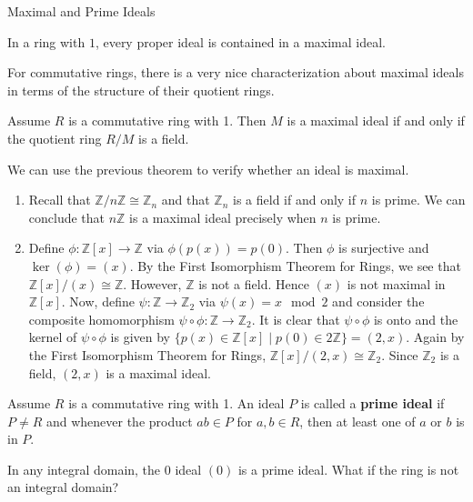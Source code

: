 \begin{section}{Maximal and Prime Ideals}
\begin{theorem}
In a ring with $1$, every proper ideal is contained in a maximal ideal.
\end{theorem}

For commutative rings, there is a very nice characterization about maximal ideals in terms of the structure of their quotient rings.

\begin{theorem}
Assume $R$ is a commutative ring with 1.  Then $M$ is a maximal ideal if and only if the quotient ring $R/M$ is a field.
\end{theorem}

\begin{example}
We can use the previous theorem to verify whether an ideal is maximal.
\begin{enumerate}[label=\textrm{(\alph*)}]
\item Recall that $\mathbb{Z}/n\mathbb{Z}\cong \mathbb{Z}_n$ and that $\mathbb{Z}_n$ is a field if and only if $n$ is prime.  We can conclude that $n\mathbb{Z}$ is a maximal ideal precisely when $n$ is prime.
\item Define $\phi:\mathbb{Z}[x]\to\mathbb{Z}$ via $\phi(p(x))=p(0)$.  Then $\phi$ is surjective and $\ker(\phi)=(x)$.  By the First Isomorphism Theorem for Rings, we see that $\mathbb{Z}[x]/(x)\cong \mathbb{Z}$.  However, $\mathbb{Z}$ is not a field.  Hence $(x)$ is not maximal in $\mathbb{Z}[x]$.  Now, define $\psi:\mathbb{Z}\to\mathbb{Z}_2$ via $\psi(x)=x\mod 2$ and consider the composite homomorphism $\psi\circ\phi:\mathbb{Z}\to\mathbb{Z}_2$.    It is clear that $\psi\circ\phi$ is onto and the kernel of $\psi\circ\phi$ is given by $\{p(x)\in\mathbb{Z}[x]\mid p(0)\in 2\mathbb{Z}\}=(2,x)$. Again by the First Isomorphism Theorem for Rings, $\mathbb{Z}[x]/(2,x)\cong \mathbb{Z}_2$.  Since $\mathbb{Z}_2$ is a field, $(2,x)$ is a maximal ideal.
\end{enumerate}
\end{example}

\begin{definition}
Assume $R$ is a commutative ring with 1.  An ideal $P$ is called a \textbf{prime ideal} if $P\neq R$ and whenever the product $ab\in P$ for $a,b\in R$, then at least one of $a$ or $b$ is in $P$.
\end{definition}

\begin{example}
In any integral domain, the 0 ideal $(0)$ is a prime ideal. What if the ring is not an integral domain?
\end{example}


\end{section}
